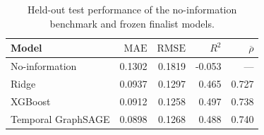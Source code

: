 \begin{table}[!htbp]
\centering
\footnotesize
\caption{Held-out test performance of the no-information benchmark and frozen finalist models.}
\label{tab:finalist-test-performance}
\begin{tabular}{lrrrr}
\toprule
Model & $\mathrm{MAE}$ & $\mathrm{RMSE}$ & $R^2$ & $\overline{\rho}$ \\
\midrule
No-information & 0.1302 & 0.1819 & -0.053 & --- \\
Ridge & 0.0937 & 0.1297 & 0.465 & 0.727 \\
XGBoost & 0.0912 & 0.1258 & 0.497 & 0.738 \\
Temporal GraphSAGE & 0.0898 & 0.1268 & 0.488 & 0.740 \\
\bottomrule
\end{tabular}
\end{table}

